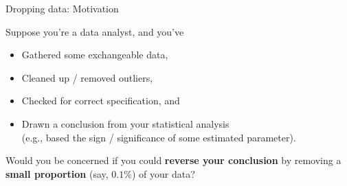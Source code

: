 \begin{frame}{Dropping data: Motivation}

Suppose you're a data analyst, and you've

\begin{itemize}
    \item Gathered some exchangeable data,
    \item Cleaned up / removed outliers,
    \item Checked for correct specification, and
    \item Drawn a conclusion from your statistical analysis \\(e.g., based
    the sign / significance of some estimated parameter).
\end{itemize}

\vspace{1em}
Would you be concerned if you could \textbf{reverse your conclusion} by removing
a \textbf{small proportion} (say, $0.1\%$) of your data?

\end{frame}


